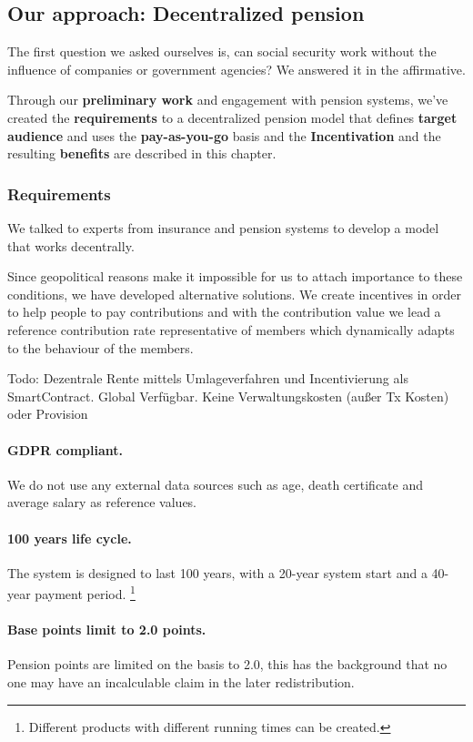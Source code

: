 \subsection{Our approach: Decentralized pension}

The first question we asked ourselves is, can social security work without the influence of companies or government agencies? We answered it in the affirmative.

Through our \textbf{preliminary work} and engagement with pension systems, we've created the \textbf{requirements} to a decentralized pension model that defines \textbf{target audience} and uses the \textbf{pay-as-you-go} basis and the \textbf{ Incentivation} and the resulting \textbf{benefits} are described in this chapter.

\subsubsection{Requirements}
We talked to experts from insurance and pension systems to develop a model that works decentrally.

Since geopolitical reasons make it impossible for us to attach importance to these conditions, we have developed alternative solutions.
We create incentives in order to help people to pay contributions and with the contribution value we lead a reference contribution rate representative of members which dynamically adapts to the behaviour of the members.

Todo: 
Dezentrale Rente mittels Umlageverfahren und Incentivierung als SmartContract.
Global Verfügbar. Keine Verwaltungskosten (außer Tx Kosten) oder Provision

\paragraph{GDPR\cite{gdpr} compliant.} We do not use any external data sources such as age, death certificate and average salary as reference values.

\paragraph{100 years life cycle.} The system is designed to last 100 years, with a 20-year system start and a 40-year payment period. \footnote{ Different products with different running times can be created.} 

\paragraph{Base points limit to 2.0 points.} Pension points are limited on the basis to 2.0, this has the background that no one may have an incalculable claim in the later redistribution.


